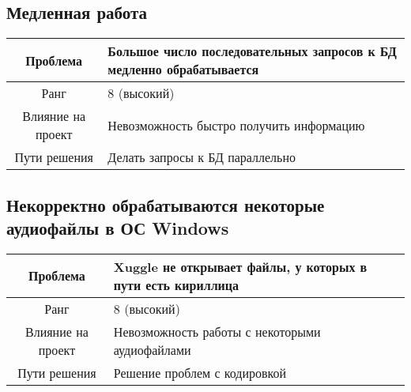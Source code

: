 \documentclass[pdftex,12pt,a4paper]{report}
\begin{document}
\subsection{Медленная работа}
\begin{table}[h]
\begin{tabular}{|c|p{10cm}|} \hline
\cellcolor[gray]{0.9} Проблема  & Большое число последовательных запросов к БД медленно обрабатывается \\ \hline
\cellcolor[gray]{0.9} Ранг  & 8 (высокий) \\ \hline
\cellcolor[gray]{0.9} Влияние на проект & Невозможность быстро получить информацию \\ \hline
\cellcolor[gray]{0.9} Пути решения  & Делать запросы к БД параллельно \\ \hline
\end{tabular}
\end{table}

\newpage
\subsection{Некорректно обрабатываются некоторые аудиофайлы в ОС Windows}
\begin{table}[h]
\begin{tabular}{|c|p{10cm}|} \hline
\cellcolor[gray]{0.9} Проблема  & Xuggle не открывает файлы, у которых в пути есть кириллица \\ \hline
\cellcolor[gray]{0.9} Ранг  & 8 (высокий) \\ \hline
\cellcolor[gray]{0.9} Влияние на проект & Невозможность работы с некоторыми аудиофайлами \\ \hline
\cellcolor[gray]{0.9} Пути решения  & Решение проблем с кодировкой \\ \hline
\end{tabular}
\end{table}
\end{document}
